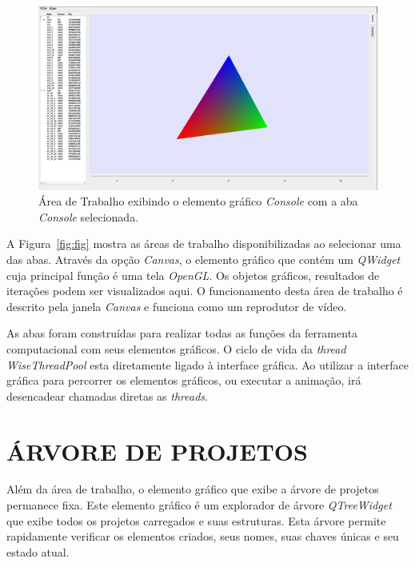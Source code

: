\begin{figure}
	\centering
	\includegraphics[width=.9\linewidth]{Figures/IGU_001.png}
	\caption{Área de Trabalho exibindo o elemento gráfico \textit{Console} com a aba \textit{Console} selecionada.}
	\label{fig:sfig2}
\end{figure}

A Figura~\ref{fig:fig} mostra as áreas de trabalho disponibilizadas ao selecionar uma das abas. Através da opção \textit{Canvas}, o elemento gráfico que contém um \textit{QWidget} cuja principal função é uma tela \textit{OpenGL}. Os objetos gráficos, resultados de iterações podem ser visualizados aqui. O funcionamento desta área de trabalho é descrito pela janela \textit{Canvas} e funciona como um 
reprodutor de vídeo.

As abas foram construídas para realizar todas as funções da ferramenta computacional com seus elementos gráficos. O ciclo de vida da \textit{thread} \textit{WiseThreadPool} esta diretamente ligado à interface gráfica. Ao utilizar a interface gráfica para percorrer os elementos gráficos, ou executar a animação, irá desencadear chamadas diretas as \textit{threads}.

\section{ÁRVORE DE PROJETOS}\label{sec:arvore_projetos}

Além da área de trabalho, o elemento gráfico que exibe a árvore de projetos permanece fixa. Este elemento gráfico é um explorador de árvore \textit{QTreeWidget} que exibe todos os projetos carregados e suas estruturas. Esta árvore permite rapidamente verificar os elementos criados, seus nomes, suas chaves únicas e seu estado atual.

